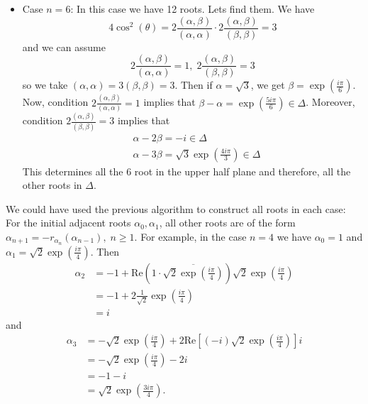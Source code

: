 \begin{itemize}
\item Case $n=6$: In this case we have 12 roots. Lets find them. We have 
\begin{equation}
    4\cos^2(\theta)=2\frac{(\alpha,\beta)}{(\alpha,\alpha)}\cdot 2\frac{(\alpha,\beta)}{(\beta,\beta)}=3
\end{equation}
and we can assume 
\begin{equation}
    2\frac{(\alpha,\beta)}{(\alpha,\alpha)}=1,\;2\frac{(\alpha,\beta)}{(\beta,\beta)}=3
\end{equation}
so we take $(\alpha,\alpha)=3(\beta,\beta)=3$. Then if $\alpha=\sqrt{3}$, we get $\beta =\exp(\frac{i\pi}{6})$. 
Now, condition $2\frac{(\alpha,\beta)}{(\alpha,\alpha)}=1$ implies that $\beta-\alpha = \exp(\frac{5i\pi}{6})\in\Delta$. 
Moreover, condition $2\frac{(\alpha,\beta)}{(\beta,\beta)}=3$ implies that 
\begin{equation}
    \begin{split}
        &\alpha-2\beta= -i \in\Delta\\
        &\alpha-3\beta=\sqrt{3}\exp(\frac{4i\pi}{3})\in\Delta
    \end{split}
\end{equation}
This determines all the 6 root in the upper half plane and therefore, all the other roots in $\Delta$.
\end{itemize}

We could have used the previous algorithm to construct all roots in each case: For the initial adjacent roots 
$\alpha_0,\alpha_1$, all other roots are of the form $\alpha_{n+1}=-r_{\alpha_n}(\alpha_{n-1}),\;n\geq1$. For
example, in the case $n=4$ we have $\alpha_0=1$ and $\alpha_1=\sqrt{2}\exp(\frac{i\pi}{4})$. Then 
\begin{equation}
    \begin{split}
        \alpha_2&=-1+\text{Re}(1\cdot\overline{\sqrt{2}\exp(\frac{i\pi}{4})})\sqrt{2}\exp(\frac{i\pi}{4})\\
    &=-1+2\frac{1}{\sqrt{2}}\exp(\frac{i\pi}{4})\\
    &=i
    \end{split} 
\end{equation}
and 
\begin{equation}
    \begin{split}
        \alpha_3&=-\sqrt{2}\exp(\frac{i\pi}{4})+2\text{Re}[(-i)\sqrt{2}\exp(\frac{i\pi}{4})]i\\
    &=-\sqrt{2}\exp(\frac{i\pi}{4})-2i\\
    &=-1-i\\
    &=\sqrt{2}\exp(\frac{3i\pi}{4}).
    \end{split}
\end{equation}

